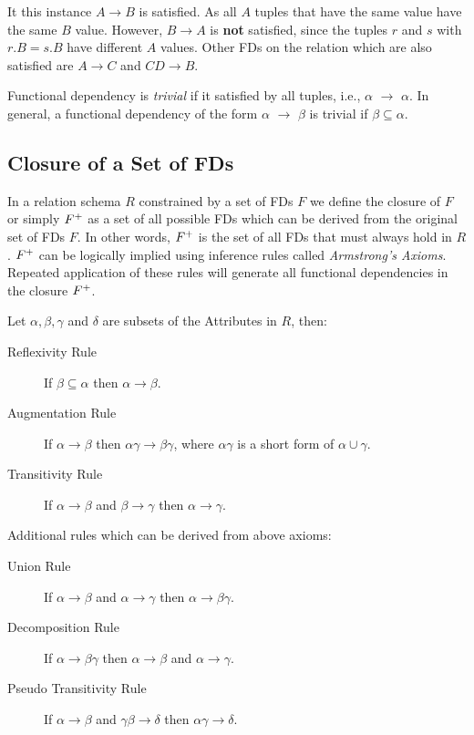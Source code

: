 It this instance $A \rightarrow B$  is satisfied.
As all $A$ tuples that have the same value have the same $B$ value. However,
$B \rightarrow A$ is \textbf{not} satisfied, since the tuples $r$ and $s$ with $r.B = s.B$ have
different $A$ values. Other FDs on the relation which are also satisfied are
$A \rightarrow C$ and $CD \rightarrow B$.

Functional dependency is \textit{trivial} if it satisfied by all tuples, i.e., $\alpha$ $\rightarrow$ $\alpha$.
In general, a functional dependency of the form $\alpha$ $\rightarrow$ $\beta$ is trivial if 
$\beta \subseteq \alpha$.

\subsection{Closure of a Set of FDs}
In a relation schema $R$ constrained by a set of FDs $F$ we define the closure of $F$ or simply $F\sp{+}$
as a set of all possible FDs which can be derived from the original set of FDs $F$. In 
other words, $F\sp{+}$ is the set of all FDs that must always hold in $R$. $F\sp{+}$ can be
logically implied using inference rules called \textit{Armstrong's Axioms}. 
Repeated application of these rules will generate all functional dependencies in the closure $F\sp{+}$.

Let $\alpha, \beta, \gamma$ and $\delta$ are subsets of the Attributes in $R$, then:

\begin{description}
  \item[Reflexivity Rule] If $\beta \subseteq \alpha$ then $\alpha \rightarrow \beta$.
  \item[Augmentation Rule] If $\alpha \rightarrow \beta$ then $\alpha\gamma \rightarrow \beta\gamma$, where $\alpha\gamma$ is a short form of $\alpha \cup \gamma$.
  \item[Transitivity Rule] If $\alpha \rightarrow \beta$ and $\beta \rightarrow \gamma$ then $\alpha \rightarrow \gamma$.
\end{description}

\noindent Additional rules which can be derived from above axioms:

\begin{description}
  \item[Union Rule] If $\alpha \rightarrow \beta$ and $\alpha \rightarrow \gamma$ then $\alpha \rightarrow \beta\gamma$.
  \item[Decomposition Rule] If $\alpha \rightarrow \beta\gamma$ then $\alpha \rightarrow \beta$ and $\alpha \rightarrow \gamma$.
  \item[Pseudo Transitivity Rule] If $\alpha \rightarrow \beta$ and $\gamma\beta \rightarrow \delta$ then $\alpha\gamma \rightarrow \delta$.
\end{description}

